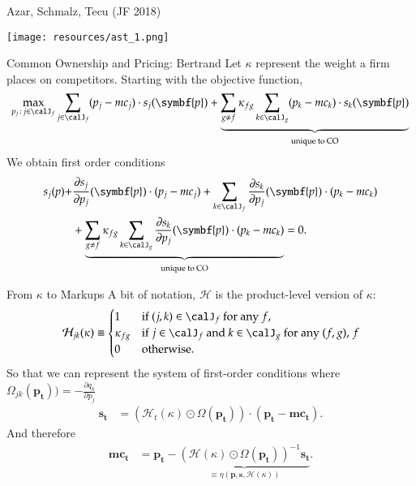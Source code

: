 \begin{frame}{Azar, Schmalz, Tecu (JF 2018)}

\begin{center}
\texttt{[image: resources/ast\_1.png]}
\end{center}
\end{frame}


\begin{frame}[plain]{Common Ownership and Pricing: Bertrand}
Let $\kappa$ represent the weight a firm places on competitors. Starting with the objective function,
 \begin{equation*}
 \max_{p_j \,:\, j \in \calJ_f} \sum_{j \in \calJ_f} (p_j - mc_j) \cdot s_j(\symbf{p})+
 \underbrace{\sum_{g\neq f} \kappa_{fg} \sum_{k \in \calJ_g} (p_k - mc_k) \cdot s_k(\symbf{p})}_{\text{unique to CO}}
 \end{equation*}
 \pause
We obtain first order conditions 
 \begin{align*}
 s_j(p) + &  \frac{\partial s_j}{\partial p_j}(\symbf{p})  \cdot (p_j - mc_j)
 + \sum_{k \in \calJ_f} \frac{\partial s_k}{\partial p_j}(\symbf{p})  \cdot (p_k - mc_k)\\
 & +\underbrace{\sum_{g\neq f} \kappa_{fg} \sum_{k \in \calJ_g} \frac{\partial s_k}{\partial p_j}(\symbf{p})  \cdot (p_k - mc_k)}_{\text{unique to CO}}=0.
  \end{align*}
\end{frame}



\begin{frame}[plain,label=recoveringeta]{From $\kappa$ to Markups}
A bit of notation, $\mathcal{H}$ is the product-level version of $\kappa$:
 \begin{equation*}
 \mathcal{H}_{jk}(\kappa) \equiv
 \begin{cases}
 1 & \text{if $(j, k) \in \calJ_f$ for any $f$,} \\
 \kappa_{fg} &  \text{if $j \in \calJ_f$ and $k \in \calJ_g$  for any $(f,g)$},\\
 0 & \text{otherwise. } \\
 \end{cases}f
 \end{equation*}
So that we can represent the system of first-order conditions where $\Omega_{jk}(\symbf{p_t})) = -\frac{\partial q_k}{\partial p_j}$
  \begin{align*}
 \symbf{s_t} &= (\mathcal{H}_t(\kappa) \odot \Omega(\symbf{p_t})) \cdot (\symbf{p_t} - \symbf{mc_t}).
 \end{align*}
And therefore
 \begin{align*}
  \symbf{mc_t} &= \symbf{p_t} - \underbrace{(\mathcal{H}(\kappa) \odot \Omega(\symbf{p_t}))^{-1} \symbf{s_t}}_{\equiv\eta(\symbf{p},\symbf{s},\mathcal{H}(\kappa))}.
 \end{align*}
 \end{frame}




